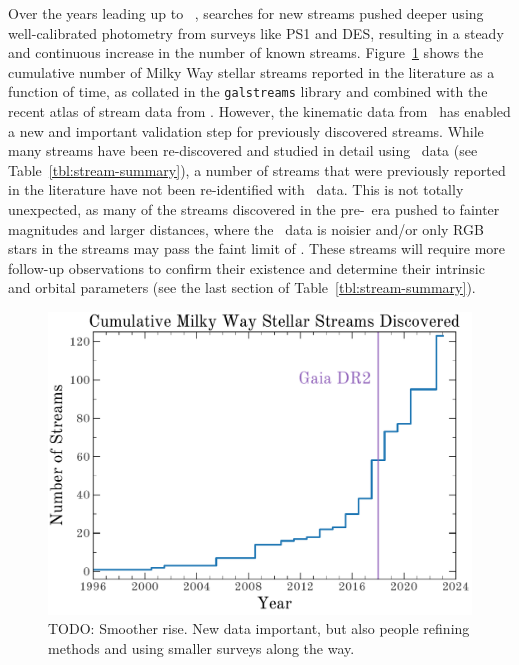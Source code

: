 \documentclass[final,5p,times,twocolumn,authoryear]{elsarticle}
\begin{document}
Over the years leading up to \gaia\ , searches for new streams pushed deeper using
well-calibrated photometry from surveys like PS1 and DES, resulting in a steady and
continuous increase in the number of known streams.
Figure~\ref{fig:num-streams} shows the cumulative number of Milky Way stellar streams
reported in the literature as a function of time, as collated in the \texttt{galstreams}
\citep{mateu:2023} library and combined with the recent atlas of stream data from
\citet{ibata:2023}.
However, the kinematic data from \gaia\ has enabled a new and important validation step
for previously discovered streams.
While many streams have been re-discovered and studied in detail using \gaia\ data (see
Table~\ref{tbl:stream-summary}), a number of streams that were previously reported in
the literature have not been re-identified with \gaia\ data.
This is not totally unexpected, as many of the streams discovered in the pre-\gaia\ era
pushed to fainter magnitudes and larger distances, where the \gaia\ data is noisier
and/or only RGB stars in the streams may pass the faint limit of \gaia.
These streams will require more follow-up observations to confirm their existence and
determine their intrinsic and orbital parameters (see the last section of
Table~\ref{tbl:stream-summary}).

\begin{figure}[t!]
    \begin{center}
    \includegraphics[width=\columnwidth]{cumulative-num-streams.pdf}
    \end{center}
    \caption{%
    TODO: Smoother rise. New data important, but also people refining methods and using smaller surveys along the way.
    \label{fig:num-streams}
    }
\end{figure}
\end{document}
